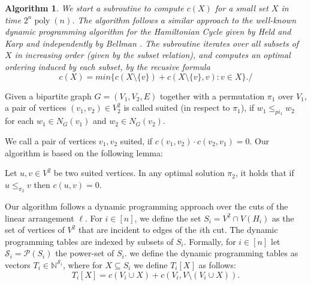 \documentclass[a4paper,UKenglish,cleveref, autoref, thm-restate]{lipics-v2021}
\newtheorem{algorithm}{Algorithm}
\begin{document}
\begin{algorithm}\label{alg:subroutine}
    We start a subroutine to compute $c(X)$ for a small set $X$ in time $2^n\operatorname{poly}(n)$. The algorithm follows a similar approach to the well-known dynamic programming algorithm for the Hamiltonian Cycle given by Held and Karp \cite{DBLP:conf/acm/HeldK61} and independently by Bellman \cite{bellman1958combinatorial}. The subroutine iterates over all subsets of $X$ in increasing order (given by the subset relation), and computes an optimal ordering induced by each subset, by the recusive formula
    \[c(X) = min\{c(X\setminus\{v\}) + c(X\setminus \{v\}, v)\colon v \in X\}./\]    
\end{algorithm}

\begin{definition}
    Given a bipartite graph $G= (V_1, V_2, E)$ together with a permutation $\pi_1$ over $V_1$, a pair of vertices $(v_1,v_2)\in V_2^2$ is called suited (in respect to $\pi_1$), if $w_1\leq_{pi_1}w_2$ for each $w_1\in N_G(v_1)$ and $w_2\in N_G(v_2)$.
\end{definition}
We call a pair of vertices $v_1, v_2$ suited, if $c(v_1,v_2)\cdot c(v_2,v_1) = 0$.
Our algorithm is based on the following lemma:
\begin{lemma}\label{lem:suited}
    Let $u,v \in V^2$ be two suited vertices. In any optimal solution $\pi_2$, it holds that if $u\leq_{\pi_2} v$ then $c(u,v) = 0$.
\end{lemma}
Our algorithm follows a dynamic programming approach over the cuts of the linear arrangement $\ell$.
For $i\in[n]$, we define the set $S_i = V^2 \cap V(H_i)$ as the set of vertices of $V^2$ that are incident to edges of the $i$th cut.
The dynamic programming tables are indexed by subsets of $S_i$.
Formally, for $i\in [n]$ let $\mathcal{S}_i = \mathcal{P}(S_i)$ the power-set of $S_i$. we define the dynamic programming tables as vectors $T_i \in \mathbb{N}^{\mathcal{S}_i}$, where for $X\subseteq S_i$ we define $T_i[X]$ as follows:
\begin{equation} \label{eq:t-def}
T_i[X] = c(V_i\cup X) + c(V_i, V\setminus (V_i\cup X)).
\end{equation}
\end{document}
